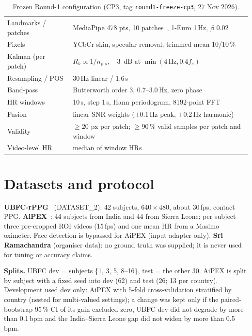 \documentclass[conference]{IEEEtran}
\begin{document}
\begin{table}[t]
\centering
\caption{Frozen Round-1 configuration (CP3, tag \texttt{round1-freeze-cp3}, 27 Nov 2026).}
\label{tab:params}
\begin{tabular}{@{}ll@{}}
\toprule
Landmarks / patches & MediaPipe 478 pts, 10 patches~\cite{li2026roi}, 1-Euro 1\,Hz, $\beta$ 0.02 \\
Pixels & YCbCr skin, specular removal, trimmed mean 10/10\,\% \\
Kalman (per patch) & $R_k\propto1/n_{\mathrm{pix}}$, \SI{-3}{dB} at $\min(4\,\mathrm{Hz}, 0.4f_s)$ \\
Resampling / POS & 30\,Hz linear / 1.6\,s \\
Band-pass & Butterworth order 3, 0.7--3.0\,Hz, zero phase \\
HR windows & 10\,s, step 1\,s, Hann periodogram, 8192-point FFT \\
Fusion & linear SNR weights ($\pm$0.1\,Hz peak, $\pm$0.2\,Hz harmonic) \\
Validity & $\ge20$ px per patch; $\ge90$\,\% valid samples per patch and window \\
Video-level HR & median of window HRs \\
\bottomrule
\end{tabular}
\end{table}

\section{Datasets and protocol}
\textbf{UBFC-rPPG}~\cite{bobbia2019ubfc} (DATASET\_2): 42 subjects, $640\times480$, about 30\,fps, contact PPG.
\textbf{AiPEX}~\cite{dasari2021bias}: 44 subjects from India and 44 from Sierra Leone; per subject three pre-cropped ROI
videos (15\,fps) and one mean HR from a Masimo oximeter. Face detection is bypassed for AiPEX (input adapter only).
\textbf{Sri Ramachandra} (organiser data): no ground truth was supplied; it is never used for tuning or accuracy claims.

\textbf{Splits.} UBFC dev = subjects \{1, 3, 5, 8--16\}, test = the other 30. AiPEX is split by subject with a fixed seed
into dev (62) and test (26; 13 per country). Development used dev only: AiPEX with 5-fold cross-validation stratified by
country (nested for multi-valued settings); a change was kept only if the paired-bootstrap 95\,\% CI of its gain excluded
zero, UBFC-dev did not degrade by more than 0.1\,bpm and the India--Sierra Leone gap did not widen by more than 0.5\,bpm.
\end{document}
